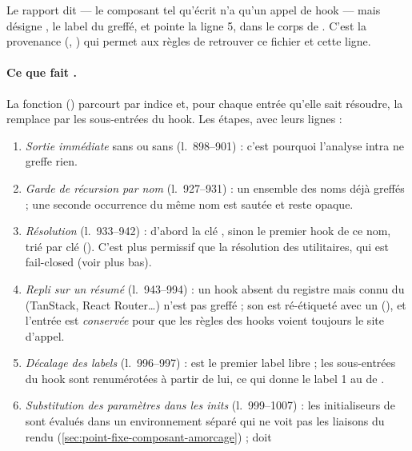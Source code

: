 Le rapport dit  --- le composant tel qu'écrit n'a qu'un
appel de hook --- mais désigne \code{[hook:1]}, le label du 
greffé, et pointe la ligne 5, dans le corps de . C'est la
provenance (, ) qui permet aux règles de
retrouver ce fichier et cette ligne.

\paragraph{Ce que fait .} La fonction
() parcourt  par indice et,
pour chaque entrée  qu'elle sait résoudre, la remplace par les
sous-entrées du hook. Les étapes, avec leurs lignes :

\begin{enumerate}
  \item \emph{Sortie immédiate} sans  ou sans
     (l.~898--901) : c'est pourquoi l'analyse intra ne
    greffe rien.
  \item \emph{Garde de récursion par nom} (l.~927--931) : un ensemble
     des noms déjà greffés ; une seconde occurrence du même
    nom est sautée et reste opaque.
  \item \emph{Résolution} (l.~933--942) : d'abord la clé
    , sinon le premier hook de ce nom, trié par
    clé (). C'est plus permissif que la résolution des
    utilitaires, qui est fail-closed (voir plus bas).
  \item \emph{Repli sur un résumé} (l.~943--994) : un hook absent du registre
    mais connu du  (TanStack, React Router\dots) n'est
    pas greffé ; son  est ré-étiqueté avec un
     (), et l'entrée  est
    \emph{conservée} pour que les règles des hooks voient toujours le site
    d'appel.
  \item \emph{Décalage des labels} (l.~996--997) :  est le
    premier label libre ; les sous-entrées du hook sont renumérotées
    à partir de lui, ce qui donne le label 1 au  de
    .
  \item \emph{Substitution des paramètres dans les inits}
    (l.~999--1007) : les initialiseurs de  sont évalués dans
    un environnement séparé qui ne voit pas les liaisons du rendu
    (\cref{sec:point-fixe-composant-amorcage}) ;  doit

\end{enumerate}
